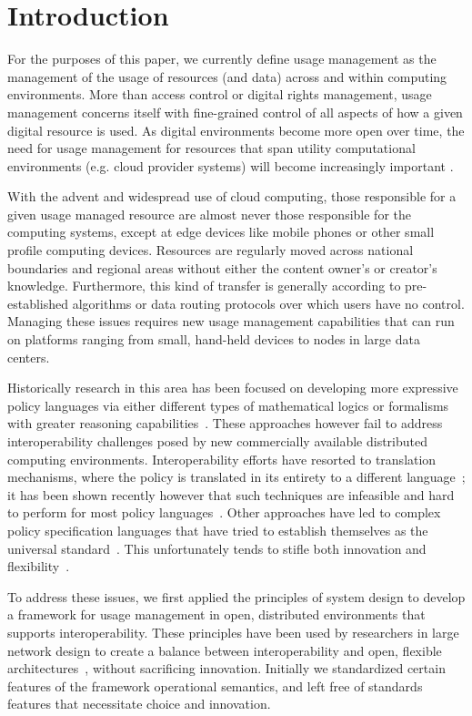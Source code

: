 \section{Introduction}
For the purposes of this paper, we currently define usage management as the management of the usage of resources (and data) across and within computing environments.  More than access control or digital rights management, usage management concerns itself with fine-grained control of all aspects of how a given digital resource is used.  As digital environments become more open over time, the need for usage management for resources that span utility computational environments (e.g. cloud provider systems) will become increasingly important \cite{ctrl:lamb-MCCCS}.

With the advent and widespread use of cloud computing, those responsible for a given usage managed resource are almost never those responsible for the computing systems, except at edge devices like mobile phones or other small profile computing devices.  Resources are regularly moved across national boundaries and regional areas without either the content owner's or creator's knowledge.  Furthermore, this kind of transfer is generally according to pre-established algorithms or data routing protocols over which users have no control.  Managing these issues requires new usage management capabilities that can run on platforms ranging from small, hand-held devices to nodes in large data centers.

Historically research in this area has been focused on developing more expressive policy languages via either different types of mathematical logics or formalisms with greater reasoning capabilities~\cite{ArHu:07,BaMi:06,ChCoEtHaJoLa:03,HaWe:04,HaWe:08,PuWe:02,XiBjFu:08}.  These approaches however fail to address interoperability challenges posed by new commercially available distributed computing environments.  Interoperability efforts have resorted to translation mechanisms, where the policy is translated in its entirety to a different language~\cite{HeJa:05,PoPrDe:04,ScTaWo:04}; it has been shown recently however that such techniques are infeasible and hard to perform for most policy languages~\cite{KoLaMaMi:04, SaShUe:04}. Other approaches have led to complex policy specification languages that have tried to establish themselves as the universal standard~\cite{OMADRM,ODRL-req,Wa:04,XrML-spec}.  This unfortunately tends to stifle both innovation and flexibility~\cite{HeJa:05,JaHe:04,JaHe:08,JaHeMa:06}.

To address these issues, we first applied the principles of system design to develop a framework for usage management in open, distributed environments that supports interoperability. These principles have been used by researchers in large network design to create a balance between interoperability and open, flexible architectures~\cite{Al:04,BlCl:01,ClWrSoBr:02}, without sacrificing innovation. Initially we standardized certain features of the framework operational semantics, and left free of standards features that necessitate choice and innovation.


